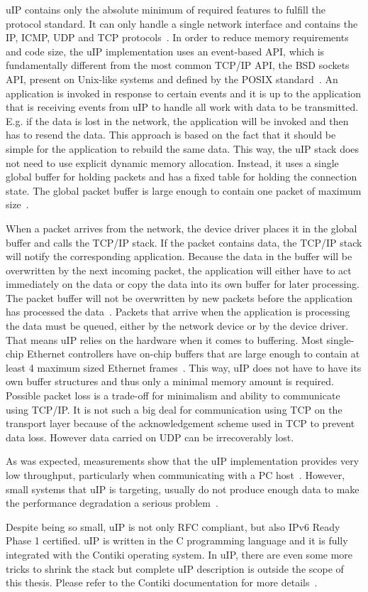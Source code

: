uIP contains only the absolute minimum of required features to fulfill the protocol standard.
It can only handle a single network interface and contains the IP, ICMP, UDP and TCP protocols~\cite{contiki-docs}.
In order to reduce memory requirements and code size,
the uIP implementation uses an event-based API, which is fundamentally different
from the most common TCP/IP API, the BSD sockets API, present on Unix-like systems
and defined by the POSIX standard~\cite{thesis-programming,posix}.
An application is invoked in response to certain events and
it is up to the application that is receiving events from uIP to handle all
work with data to be transmitted. E.g. if the data is lost in the network,
the application will be invoked and then has to resend the data.
This approach is based on the fact that it should be simple for the application
to rebuild the same data.
This way, the uIP stack does not need to use explicit dynamic memory allocation.
Instead, it uses a single global buffer for holding packets and has a fixed
table for holding the connection state.
The global packet buffer is large enough to contain one packet of maximum size~\cite{contiki-docs}.

When a packet arrives from the network, the device driver places it in the
global buffer and calls the TCP/IP stack.
If the packet contains data, the TCP/IP stack will notify the corresponding application.
Because the data in the buffer will be overwritten by the next incoming packet,
the application will either have to act immediately on the data or copy the data into
its own buffer for later processing.
The packet buffer will not be overwritten by new packets before the application has processed the data~\cite{contiki-docs}.
Packets that arrive when the application is processing the data must be queued,
either by the network device or by the device driver.
That means uIP relies on the hardware when it comes to buffering.
Most single-chip Ethernet controllers have on-chip buffers
that are large enough to contain at least 4 maximum sized Ethernet frames~\cite{contiki-docs}.
This way, uIP does not have to have its own buffer structures and thus
only a minimal memory amount is required.
Possible packet loss is a trade-off for minimalism and ability to communicate using TCP/IP.
It is not such a big deal for communication using TCP on the transport layer
because of the acknowledgement scheme used in TCP to prevent data loss.
However data carried on UDP can be irrecoverably lost.

As was expected, measurements show that the uIP implementation provides very low
throughput, particularly when communicating with a PC host~\cite{thesis-towards}.
However, small systems that uIP is targeting, usually do not produce enough data
to make the performance degradation a serious problem~\cite{thesis-towards}.

Despite being so small, uIP is not only RFC compliant, but also IPv6 Ready Phase 1 certified.
uIP is written in the C programming language and it is fully integrated with the Contiki operating system.
In uIP, there are even some more tricks to shrink the stack
but complete uIP description is outside the scope of this thesis.
Please refer to the Contiki documentation for more details~\cite{contiki-docs}.
